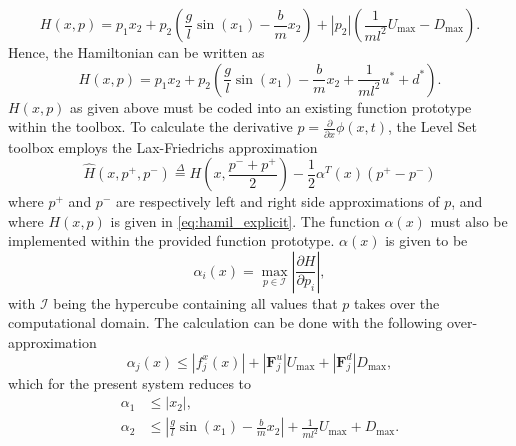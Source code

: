 \documentclass[../main.tex]{subfiles}
\begin{document}
\begin{equation}\label{eq:hamil_explicit}
    H(x,p) = p_1x_2+p_2\left(\frac{g}{l}\sin(x_1)-\frac{b}{m}x_2\right)+|p_2|\left(\frac{1}{ml^2}U_{\text{max}}-D_{\text{max}}\right).
\end{equation}
\fi
Hence, the Hamiltonian can be written as
\begin{equation}\label{eq:hamil_explicit}
    H(x,p) = p_1x_2+p_2\left(\frac{g}{l}\sin(x_1)-\frac{b}{m}x_2+\frac{1}{ml^2}u^*+d^*\right).
\end{equation}
$H(x,p)$ as given above must be coded into an existing function prototype within the toolbox.
To calculate the derivative $p = \frac{\partial}{\partial x} \phi(x,t)$, the Level Set toolbox employs the Lax-Friedrichs approximation 
\begin{equation}
    \widehat{H}(x,p^+,p^-) \overset{\Delta}{=} H\left(x,\frac{p^-+p^+}{2}\right) - \frac{1}{2} \alpha^T(x)(p^+-p^-)
\end{equation}
where $p^+$ and $p^-$ are respectively left and right side approximations of $p$, and where $H(x,p)$ is given in \eqref{eq:hamil_explicit}. The function $\alpha(x)$ must also be implemented within the provided function prototype. $\alpha(x)$ is given to be
\begin{equation}
    \alpha_i(x) = \max_{p\in\mathcal{I}} \left|\frac{\partial H}{\partial p_i}\right|,
\end{equation}
with $\mathcal{I}$ being the hypercube containing all values that $p$ takes over the computational domain. The calculation can be done with the following over-approximation
\begin{equation}
    \alpha_j(x) \leq |f_j^x(x)| + |\textbf{F}_j^u|U_{\text{max}} + |\textbf{F}_j^d|D_{\text{max}}, 
\end{equation}
which for the present system reduces to 
\begin{align}
    \alpha_1 &\leq |x_2|,\\
    \alpha_2 &\leq \left|\frac{g}{l}\sin(x_1)-\frac{b}{m}x_2\right| + \frac{1}{ml^2}U_{\text{max}} + D_{\text{max}}.
\end{align}
\end{document}
